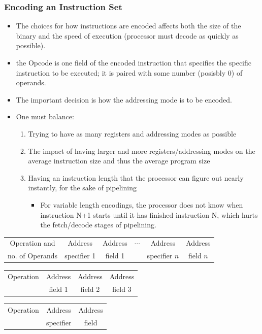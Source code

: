 \subsubsection{Encoding an Instruction Set}
\begin{itemize}
  \item The choices for how instructions are encoded affects both the size of the binary and the speed of execution (processor must decode as quickly as possible).
  \item the Opcode is one field of the encoded instruction that specifies the specific instruction to be executed; it is paired with some number (posisbly 0) of operands.
  \item The important decision is how the addressing mode is to be encoded.
  \item One must balance: 
  \begin{enumerate}
    \item Trying to have as many registers and addressing modes as possible
    \item The impact of having larger and more registers/addressing modes on the average instruction size and thus the average program size 
    \item Having an instruction length that the processor can figure out nearly instantly, for the sake of pipelining
    \begin{itemize}
      \item For variable length encodings, the processor does not know when instruction N+1 starts until it has finished instruction N, which hurts the fetch/decode stages of pipelining.
    \end{itemize}
  \end{enumerate}
\end{itemize}
\begin{tabular}{|c|c|c|c|c|c|}
\hline
Operation and & Address & Address & $\cdots$ & Address & Address \\
no. of Operands & specifier 1 & field 1 & & specifier $n$ & field $n$\\ 
\hline
\end{tabular}
\begin{tabular}{|c|c|c|c|}
\hline
Operation & Address & Address & Address \\
& field 1 & field 2 & field 3 \\
\hline 
\end{tabular}
\begin{tabular}{|c|c|c|}
\hline
Operation & Address & Address \\ 
& specifier & field \\ 
\hline
\end{tabular} \\
